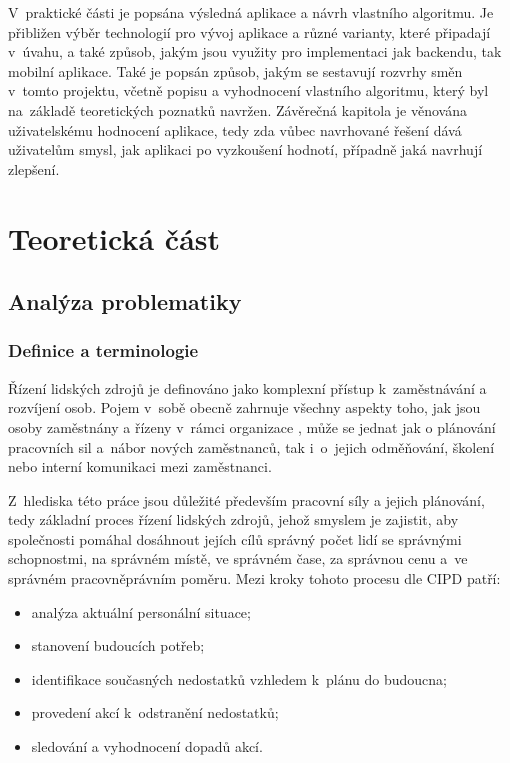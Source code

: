 \documentclass[a4paper,11pt,openany,twoside]{book}
\begin{document}
V~praktické části je popsána výsledná aplikace a návrh vlastního algoritmu. Je přibližen výběr technologií pro vývoj aplikace a různé varianty, které připadají v~úvahu, a také způsob, jakým jsou využity pro implementaci jak backendu, tak mobilní aplikace. Také je popsán způsob, jakým se sestavují rozvrhy směn v~tomto projektu, včetně popisu a vyhodnocení vlastního algoritmu, který byl na~základě teoretických poznatků navržen. Závěrečná kapitola je věnována uživatelskému hodnocení aplikace, tedy zda vůbec navrhované řešení dává uživatelům smysl, jak aplikaci po vyzkoušení hodnotí, případně jaká navrhují zlepšení.

\part{Teoretická část}
\chapter{Analýza problematiky}

\section{Definice a terminologie}

Řízení lidských zdrojů je definováno jako komplexní přístup k~zaměstnávání a rozvíjení osob. Pojem v~sobě obecně zahrnuje všechny aspekty toho, jak jsou osoby zaměstnány a řízeny v~rámci organizace \cite[s.~1]{armstrong2014}, může se jednat jak o plánování pracovních sil a~nábor nových zaměstnanců, tak i~o~jejich odměňování, školení nebo interní komunikaci mezi zaměstnanci. \cite[s.~37]{armstrong2014}

Z~hlediska této práce jsou důležité především pracovní síly a jejich plánování, tedy základní proces řízení lidských zdrojů, jehož smyslem je zajistit, aby společnosti pomáhal dosáhnout jejích cílů správný počet lidí se správnými schopnostmi, na správném místě, ve správném čase, za správnou cenu a~ve správném pracovněprávním poměru. Mezi kroky tohoto procesu dle CIPD \cite{cipd2020workforce} patří:
\begin{itemize}
	\item analýza aktuální personální situace;
	\item stanovení budoucích potřeb;
	\item identifikace současných nedostatků vzhledem k~plánu do budoucna;
	\item provedení akcí k~odstranění nedostatků;
	\item sledování a vyhodnocení dopadů akcí.
\end{itemize}
\end{document}
